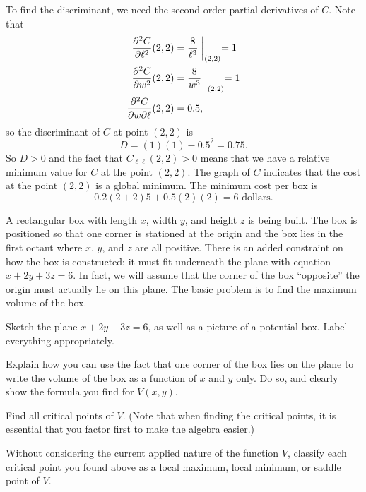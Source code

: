 \begin{exercises}
\begin{exerciseSolution}
To find the discriminant, we need the second order partial derivatives of $C$. Note that
\begin{align*}
\frac{\partial^2 C}{\partial \ell^2}(2,2) &= \frac{8}{\ell^3}\biggm|_{(2,2)} = 1 \\
\frac{\partial^2 C}{\partial w^2}(2,2) &= \frac{8}{w^3}\biggm|_{(2,2)} = 1 \\
\frac{\partial^2 C}{\partial w \partial \ell}(2,2) &= 0.5,
\end{align*}
so the discriminant of $C$ at point $(2,2)$ is
\[D=(1)(1) - 0.5^2 = 0.75.\]
So $D>0$ and the fact that $C_{\ell \ell}(2,2) > 0$ means that we have a relative minimum value for $C$ at the point $(2,2)$. The graph of $C$ indicates that the cost at the point $(2,2)$ is a global minimum. The minimum cost per box is
\[0.2(2+2)5 + 0.5(2)(2) = 6 \text{ dollars}.\]
\ea

\end{exerciseSolution}

\item A rectangular box with length $x$, width $y$, and height $z$ is being built.  The box is positioned so that one corner is stationed at the origin and the box lies in the first octant where $x$, $y$, and $z$ are all positive.  There is an added constraint on how the box is constructed:  it must fit underneath the plane with equation $x + 2y + 3z = 6$.  In fact, we will assume that the corner of the box ``opposite'' the origin must actually lie on this plane. The basic problem is to find the maximum volume of the box.  

\ba

	\item Sketch the plane $x + 2y + 3z = 6$, as well as a picture of a potential box.  Label everything appropriately.

	\item Explain how you can use the fact that one corner of the box lies on the plane to write the volume of the box as a function of $x$ and $y$ only.  Do so, and clearly show the formula you find for $V(x,y)$.

	\item Find all critical points of $V$.  (Note that when finding the critical points, it is essential that you factor first to make the algebra easier.)  

	\item Without considering the current applied nature of the function $V$, classify each critical point you found above as a local maximum, local minimum, or saddle point of $V$.


\end{exercises}
